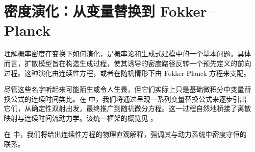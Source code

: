 \chapter{密度演化：从变量替换到 Fokker–Planck}\label{app:continuity}

理解概率密度在变换下如何演化，是概率论和生成式建模中的一个基本问题。具体而言，扩散模型旨在构造生成过程，使其诱导的密度路径反转一个预先定义的前向过程。这种演化由连续性方程，或者在随机情形下由 Fokker-Planck 方程来支配。

尽管这些名字听起来可能陌生或令人生畏，但它们实际上只是基础微积分中变量替换公式的连续时间类比。在  中，我们将通过呈现一系列变量替换公式来逐步引出它们，从确定性双射出发，最终推广到随机微分方程。这一过程自然地桥接了离散映射与连续时间流动力学。该统一框架的概览见 。

在  中，我们将给出连续性方程的物理直观解释，强调其与动力系统中密度守恒的联系。



